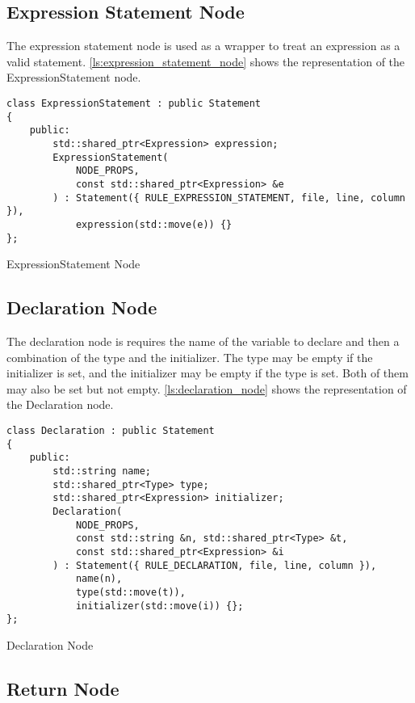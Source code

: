 \subsection{Expression Statement Node}

The expression statement node is used as a wrapper to treat an expression as a valid statement.
\autoref{ls:expression_statement_node} shows the representation of the ExpressionStatement node.

\begin{listing}[H]
\begin{verbatim}
class ExpressionStatement : public Statement
{
    public:
        std::shared_ptr<Expression> expression;
        ExpressionStatement(
            NODE_PROPS,
            const std::shared_ptr<Expression> &e
        ) : Statement({ RULE_EXPRESSION_STATEMENT, file, line, column }),
            expression(std::move(e)) {}
};
\end{verbatim}
\caption{ExpressionStatement Node}
\label{ls:expression_statement_node}
\end{listing}

\subsection{Declaration Node}

The declaration node is requires the name of the variable to declare and then a combination of the type and the initializer.
The type may be empty if the initializer is set, and the initializer may be empty if the type is set. Both of them may also be set
but not empty.
\autoref{ls:declaration_node} shows the representation of the Declaration node.

\begin{listing}[H]
\begin{verbatim}
class Declaration : public Statement
{
    public:
        std::string name;
        std::shared_ptr<Type> type;
        std::shared_ptr<Expression> initializer;
        Declaration(
            NODE_PROPS,
            const std::string &n, std::shared_ptr<Type> &t,
            const std::shared_ptr<Expression> &i
        ) : Statement({ RULE_DECLARATION, file, line, column }),
            name(n),
            type(std::move(t)),
            initializer(std::move(i)) {};
};
\end{verbatim}
\caption{Declaration Node}
\label{ls:declaration_node}
\end{listing}

\subsection{Return Node}

